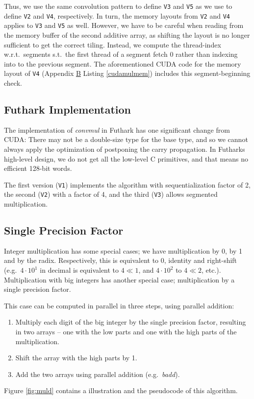 Thus, we use the same convolution pattern to define \texttt{V3} and \texttt{V5}
as we use to define \texttt{V2} and \texttt{V4}, respectively. In turn, the
memory layouts from \texttt{V2} and \texttt{V4} applies to \texttt{V3} and
\texttt{V5} as well. However, we have to be careful when reading from the memory
buffer of the second additive array, as shifting the layout is no longer
sufficient to get the correct tiling. Instead, we compute the thread-index
w.r.t.\ segments s.t.\ the first thread of a segment fetch $0$ rather than
indexing into to the previous segment. The aforementioned CUDA code for the
memory layout of \texttt{V4} (Appendix \hyperref[app:B]{B} Listing
\ref{cudamulmem}) includes this segment-beginning check.

\subsection{Futhark Implementation}
\label{subsec:mulfut}
{}

The implementation of \textit{convmul} in Futhark has one significant change
from CUDA: There may not be a double-size type for the base type, and so we
cannot always apply the optimization of postponing the carry propagation. In
Futharks high-level design, we do not get all the low-level C primitives, and
that means no efficient 128-bit words.

The first version (\texttt{V1}) implements the algorithm with sequentialization
factor of 2, the second (\texttt{V2}) with a factor of 4, and the third
(\texttt{V3}) allows segmented multiplication.

\subsection{Single Precision Factor}
\label{subsec:mulsin}

Integer multiplication has some special cases; we have multiplication by 0, by 1
and by the radix. Respectively, this is equivalent to 0, identity and
right-shift (e.g.\ $4 \cdot 10^1$ in decimal is equivalent to $4 \ll 1$, and
$4\cdot 10^2$ to $4\ll 2$, etc.). Multiplication with big integers has another special
case; multiplication by a single precision factor.

This case can be computed in parallel in three steps, using parallel addition:
\begin{enumerate}[label=\Roman*]
\item Multiply each digit of the big integer by the single precision factor,
  resulting in two arrays -- one with the low parts and one with the high parts
  of the multiplication.
\item Shift the array with the high parts by 1.
\item Add the two arrays using parallel addition (e.g.\ \textit{badd}).
\end{enumerate}
Figure \ref{fig:muld} contains a illustration and the pseudocode of this
algorithm.

